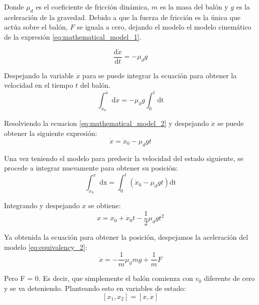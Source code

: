 Donde $\mu_d$ es el coeficiente de fricción dinámica, $m$ es la masa del balón y $g$ es la aceleración de la gravedad. Debido a que la fuerza de fricción es la única que actúa sobre el balón, $F$ se iguala a cero, dejando el modelo el modelo cinemático de la expresión \ref{eq:mathematical_model_1}.

\begin{equation}
\frac{\mathrm{d} \dot{x}}{\mathrm{d} t} = - \mu_d g
\label{eq:mathematical_model_1}
\end{equation}

Despejando la variable $\dot{x}$ para se puede integrar la ecuación para obtener la velocidad en el tiempo $t$ del balón.
\begin{equation}
\int_{\dot{x}_0}^{\dot{x}} \mathrm{d} \dot{x} = -\mu_d g \int_{0}^{t} \mathrm{dt}  
\label{eq:mathematical_model_2}
\end{equation}

Resolviendo la ecuacion \ref{eq:mathematical_model_2} y despejando $\dot{x}$ se puede obtener la siguiente expresión:
\begin{equation}
\dot{x} = \dot{x}_{0} - \mu_d g t 
\label{eq:velocity_prediction}
\end{equation}

Una vez teniendo el modelo para predecir la velocidad del estado siguiente, se procede a integrar nuevamente para obtener su posición:
\begin{equation}
\int_{x_{0}}^{x} \mathrm{dx} = \int_{0}^{t} (\dot{x}_{0} - \mu_d g t) \mathrm{dt}
\label{eq:mathematical_model_4}
\end{equation}

Integrando y despejando $x$ se obtiene:
\begin{equation}
x = x_0 + \dot{x}_0 t - \frac{1}{2} \mu_d g t^2
\label{eq:position_prediction}
\end{equation}

Ya obtenida la ecuación para obtener la posición, despejamos la aceleración del modelo \ref{eq:equivalency_2}:
\begin{equation}
\ddot{x} = -\frac{1}{m}\mu_d m g + \frac{1}{m}F
\end{equation}

Pero F = 0. Es decir, que simplemente el balón comienza con $v_{0}$ diferente de cero y se va deteniendo.
Planteando esto en variables de estado:
\[ [x_1,x_2] = [x, \dot{x}]\]

